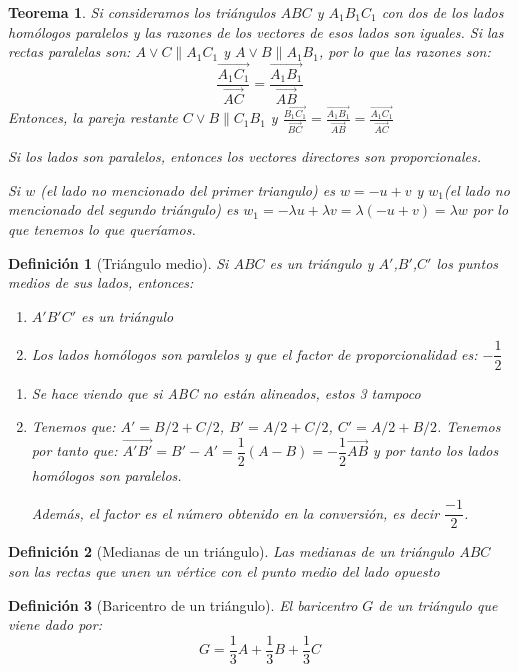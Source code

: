 \documentclass[11pt, a4paper, titlepage]{article}
\makeatletter
\renewenvironment{proof}[1][\proofname] {\vspace{-15pt}\par\pushQED{\qed}\normalfont\topsep6\p@\@plus6\p@\relax\trivlist\item[\hskip\labelsep\it#1\@addpunct{.}]\ignorespaces}{\popQED\endtrivlist\@endpefalse}
\theoremstyle{theorem-style}
\newtheorem*{nth}{Teorema}
\theoremstyle{definition-style}
\newtheorem*{ndef}{Definición}
\theoremstyle{remark-style}
\theoremstyle{example-style}
\newenvironment{nlist}
{\begin{enumerate}
\renewcommand\labelenumi{(\emph{\roman{enumi})}}}
{\end{enumerate}}
\makeatother
\begin{document}
\begin{nth}
	Si consideramos los triángulos $ABC$ y $A_1B_1C_1$ con dos de los lados homólogos paralelos y las razones de los vectores de esos lados son iguales. 
	Si las rectas paralelas son: $A\vee C \parallel A_1C_1$ y $A\vee B \parallel A_1B_1$, por lo que las razones son:
	\[
	\frac{\vec{A_1C_1}}{\vec{AC}} = \frac{\vec{A_1B_1}}{\vec{AB}}
	\]
	Entonces, la pareja restante $C\vee B \parallel C_1B_1$ y $\frac{\vec{B_1C_1}}{\vec{BC}} = \frac{\vec{A_1B_1}}{\vec{AB}} = \frac{\vec{A_1C_1}}{\vec{AC}}$\\
	\begin{proof}
	Si los lados son paralelos, entonces los vectores directores son proporcionales.
	
	Si $w$ (el lado no mencionado del primer triangulo) es $w=-u+v$ y $w_1$(el lado no mencionado del segundo triángulo) es $w_1 = - \lambda u + \lambda v = \lambda (-u+v) = \lambda w$  por lo que tenemos lo que queríamos.
\end{proof}
\end{nth}
 
\begin{ndef}[Triángulo medio]
	Si $ABC$ es un triángulo y $A'$,$B'$,$C'$ los puntos medios de sus lados, entonces:
	\begin{nlist}
	\item $A'B'C'$ es un triángulo
	\item Los lados homólogos son paralelos y que el factor de proporcionalidad es: $-\dfrac{1}{2}$
\end{nlist}\vspace{0.2cm}
\begin{proof}

	\begin{nlist}
	\item Se hace viendo que si ABC no están alineados, estos 3 tampoco
	\item Tenemos que: $A' = B/2 + C/2$, $B' = A/2+C/2$, $C' = A/2 + B/2$. Tenemos por tanto que: $\vec{A'B'} = B'-A' = \dfrac{1}{2}(A-B) = -\dfrac{1}{2} \vec{AB}$ y por tanto los lados homólogos son paralelos.

Además, el factor es el número obtenido en la conversión, es decir $\dfrac{-1}{2}$.
\end{nlist}
\end{proof}
\end{ndef}

\begin{ndef}[Medianas de un triángulo]
Las medianas de un triángulo $ABC$ son las rectas que unen un vértice con el punto medio del lado opuesto
\end{ndef}
\begin{ndef}[Baricentro de un triángulo]
	El baricentro $G$ de un triángulo que viene dado por:
	\[
	G = \dfrac{1}{3} A +  \dfrac{1}{3} B +  \dfrac{1}{3} C
	\]
\end{ndef}
\end{document}
